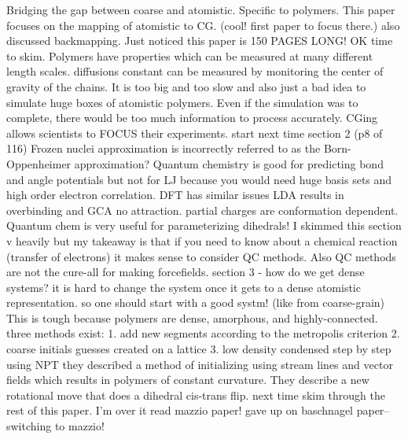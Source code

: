 \documentclass{article}
\begin{document}
Bridging the gap between coarse and atomistic. Specific to polymers. This paper focuses on the mapping of atomistic to CG. (cool! first paper to focus there.) also discussed backmapping. Just noticed this paper is 150 PAGES LONG! OK time to skim.
Polymers have properties which can be measured at many different length scales. diffusions constant can be measured by monitoring the center of gravity of the chains.
It is too big and too slow and also just a bad idea to simulate huge boxes of atomistic polymers. Even if the simulation was to complete, there would be too much information to process accurately. CGing allows scientists to FOCUS their experiments.
start next time section 2 (p8 of 116)
Frozen nuclei approximation is incorrectly referred to as the Born-Oppenheimer approximation?
Quantum chemistry is good for predicting bond and angle potentials but not for LJ because you would need huge basis sets and high order electron correlation. DFT has similar issues LDA results in overbinding and GCA no attraction. partial charges are conformation dependent. 
Quantum chem is very useful for parameterizing dihedrals!
I skimmed this section v heavily but my takeaway is that if you need to know about a chemical reaction (transfer of electrons) it makes sense to consider QC methods. Also QC methods are not the cure-all for making forcefields.
section 3 - how do we get dense systems?
it is hard to change the system once it gets to a dense atomistic representation. so one should start with a good systm! (like from coarse-grain)
This is tough because polymers are dense, amorphous, and highly-connected. three methods exist:
1. add new segments according to the metropolis criterion
2. coarse initials guesses created on a lattice
3. low density condensed step by step using NPT
they described a method of initializing using stream lines and vector fields which results in polymers of constant curvature.
They describe a new rotational move that does a dihedral cis-trans flip.
next time skim through the rest of this paper. I'm over it
read mazzio paper!
gave up on baschnagel paper--switching to mazzio!

\cite{Mazzio2015}
\end{document}
